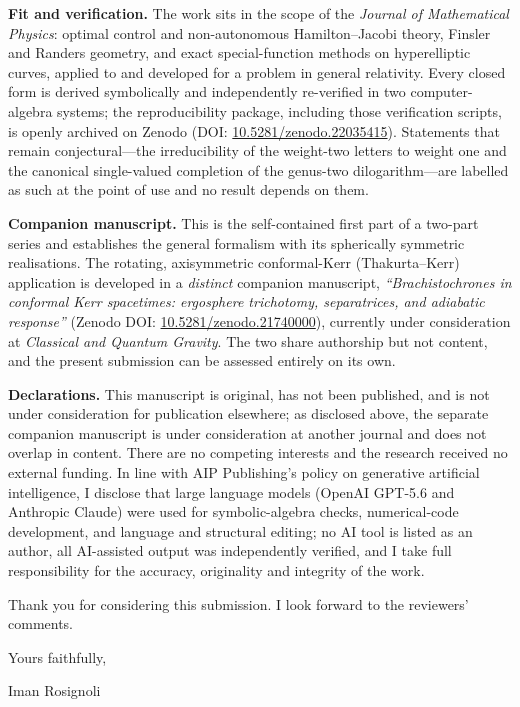 \documentclass[11pt]{article}
\begin{document}
\vspace{0.3em}
\noindent\textbf{Fit and verification.} The work sits in the scope of the \emph{Journal of
Mathematical Physics}: optimal control and non-autonomous Hamilton--Jacobi theory, Finsler
and Randers geometry, and exact special-function methods on hyperelliptic curves, applied
to and developed for a problem in general relativity. Every closed form is derived
symbolically and independently re-verified in two computer-algebra systems; the
reproducibility package, including those verification scripts, is openly archived on
Zenodo (DOI: \href{https://doi.org/10.5281/zenodo.22035415}{10.5281/zenodo.22035415}).
Statements that remain conjectural---the irreducibility of the weight-two letters to
weight one and the canonical single-valued completion of the genus-two dilogarithm---are
labelled as such at the point of use and no result depends on them.

\vspace{0.3em}
\noindent\textbf{Companion manuscript.} This is the self-contained first part of a
two-part series and establishes the general formalism with its spherically symmetric
realisations. The rotating, axisymmetric conformal-Kerr (Thakurta--Kerr) application is
developed in a \emph{distinct} companion manuscript, \emph{``Brachistochrones in conformal
Kerr spacetimes: ergosphere trichotomy, separatrices, and adiabatic response''} (Zenodo
DOI: \href{https://doi.org/10.5281/zenodo.21740000}{10.5281/zenodo.21740000}), currently
under consideration at \emph{Classical and Quantum Gravity}. The two share authorship but
not content, and the present submission can be assessed entirely on its own.

\vspace{0.3em}
\noindent\textbf{Declarations.} This manuscript is original, has not been published, and
is not under consideration for publication elsewhere; as disclosed above, the separate
companion manuscript is under consideration at another journal and does not overlap in
content. There are no competing interests and the research received no external funding.
In line with AIP Publishing's policy on generative artificial intelligence, I disclose
that large language models (OpenAI GPT-5.6 and Anthropic Claude) were used for
symbolic-algebra checks, numerical-code development, and language and structural editing;
no AI tool is listed as an author, all AI-assisted output was independently verified, and
I take full responsibility for the accuracy, originality and integrity of the work.

\vspace{0.3em}
Thank you for considering this submission. I look forward to the reviewers' comments.

\vspace{0.3em}
\noindent Yours faithfully,

\vspace{0.9em}
\noindent Iman Rosignoli
\end{document}
